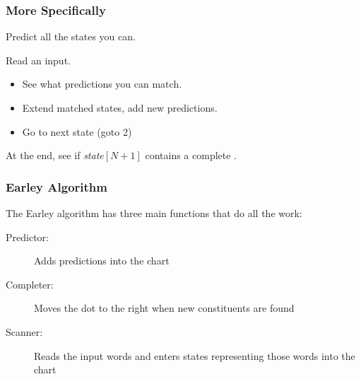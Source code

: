 
\begin{frame}[fragile]
  \frametitle{More Specifically}


  \begin{enum}
  \item Predict all the states you can.
    
  \item Read an input.
    \begin{itemize}
    \item See what predictions you can match.
    \item Extend matched states, add new predictions.
    \item Go to next state (goto 2)
  \end{itemize}

  \item At the end, see if \textit{state\/}$[N+1]$ contains a complete \Se.
\end{enum}

\end{frame}

%


\begin{frame}[fragile]
  \frametitle{Earley Algorithm}


The Earley algorithm has three main functions that do all the work:
\begin{description}
\item [Predictor:] Adds predictions into the chart
\item [Completer:] Moves the dot to the right when new constituents are
  found
\item [Scanner:] Reads the input words and enters states representing
  those words into the chart
\end{description}


\end{frame}


